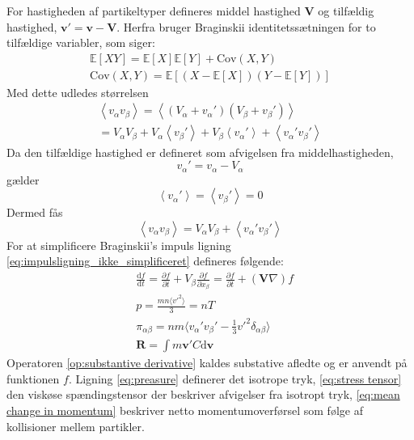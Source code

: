 For hastigheden af partikeltyper defineres middel hastighed $\mathbf{V}$ og tilfældig hastighed, $\mathbf{v'} =  \mathbf{v - V}$.
Herfra bruger Braginskii identitetssætningen for to tilfældige variabler, som siger:
\begin{gather*}
    \mathbb{E}\left[XY\right] = \mathbb{E}\left[X\right]\mathbb{E}\left[Y\right] + \mathrm{Cov}(X,Y) \\
    \mathrm{Cov}(X,Y) = \mathbb{E}\left[(X-\mathbb{E}[X])(Y-\mathbb{E}[Y])\right] 
\end{gather*}
Med dette udledes størrelsen
\begin{gather*}
    \left\langle v_\alpha v_\beta \right\rangle = \left\langle(V_\alpha + v_\alpha')(V_\beta + v_\beta')\right\rangle \\
    = V_\alpha V_\beta + V_\alpha \left\langle v_\beta' \right\rangle + V_\beta \left\langle v_\alpha' \right\rangle + \left\langle v_\alpha'v_\beta' \right\rangle
\end{gather*}
Da den tilfældige hastighed er defineret som afvigelsen fra middelhastigheden,
\begin{equation*}
    v_\alpha' = v_\alpha - V_\alpha
\end{equation*}
gælder
\begin{equation*} \left\langle v_\alpha' \right\rangle = \left\langle v_\beta' \right\rangle = 0
\end{equation*}
Dermed fås
\begin{equation*} 
    \left\langle v_\alpha v_\beta \right\rangle = V_\alpha V_\beta + \left\langle v_\alpha'v_\beta' \right\rangle
\end{equation*}
For at simplificere Braginskii's impuls ligning \eqref{eq:impulsligning_ikke_simplificeret} defineres følgende:
\begin{align}
    &\frac{\mathrm{d}f}{\mathrm{d}t}
    = \frac{\partial f}{\partial t} + V_\beta \frac{\partial f}{\partial x_\beta}
    = \frac{\partial f}{\partial t} + (\mathbf{V}\nabla)f \label{op:substantive derivative} \\
    &p = \frac{mn \langle v'^2\rangle}{3} = nT \label{eq:preasure}\\
    &\pi_{\alpha\beta} = nm\langle v_\alpha ' v_\beta ' - \frac{1}{3}v'^2\delta_{\alpha\beta} \rangle \label{eq:stress tensor}\\
    &\mathbf{R} = \int m\mathbf{v}'C \mathrm{d}\mathbf{v} \label{eq:mean change in momentum}
\end{align}
Operatoren \eqref{op:substantive derivative} kaldes substative afledte og er anvendt på funktionen $f$.
Ligning \eqref{eq:preasure} definerer det isotrope tryk,
\eqref{eq:stress tensor} den viskøse spændingstensor der  beskriver afvigelser fra isotropt tryk,
\eqref{eq:mean change in momentum} beskriver netto momentumoverførsel som følge af kollisioner mellem partikler.

